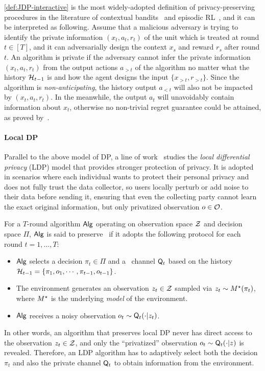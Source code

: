 \cref{def:JDP-interactive} is the most widely-adopted definition of privacy-preserving procedures in the literature of contextual bandits~\citep{shariff2018differentially, azize2024open} and episodic RL~\citep{vietri2020private}, and it can be interpreted as following.
Assume that a malicious adversary is trying to identify the private information $(x_t,a_t,r_t)$ of the unit which is treated at round $t\in[T]$, and it can adversarially design the context $x_{s}$ and reward $r_s$ after round $t$. An algorithm is private if the adversary cannot infer the private information  $(x_t,a_t,r_t)$ from the output actions $a_{>t}$ of the algorithm no matter what the history $\mathcal{H}_{t-1}$ is and how the agent designs the input 
$\{x_{>t},r_{>t}\}$. Since the algorithm is \emph{non-anticipating}, %
the history output $a_{<t}$ will also not be impacted by $(x_t,a_t,r_t)$. In the meanwhile, the output $a_t$ will unavoidably contain information about $x_t$, otherwise no non-trivial regret guarantee could be attained, as proved by~\citet{shariff2018differentially}.


\paragraph{Local DP}
Parallel to the above model of DP, a line of work~\citep{kasiviswanathan2011can,duchi2013local,duchi2016local} studies the \emph{local differential privacy} (LDP) model that provides stronger protection of privacy. It is adopted in scenarios where each individual wants to protect their personal privacy and does not fully trust the data collector, so users locally perturb or add noise to their data before sending it, ensuring that even the collecting party cannot learn the exact original information, but only privatized observation $o \in \mathcal{O}$. 




For a $T$-round algorithm $\mathsf{Alg}$ operating on observation space $\mathcal{Z}$ and decision space $\Pi$, $\mathsf{Alg}$ is said to preserve \aLDP~if it adopts the following protocol for each round $t=1,...,T$:
\begin{itemize}
  \setlength{\parskip}{2pt}
    \item $\mathsf{Alg}$ selects a decision $\pi_t\in \Pi$ and a \aDP~channel $\mathsf{Q}_t$ based on the history $\mathcal{H}_{t-1}=\{\pi_1,o_1 ,\cdots, \pi_{t-1}, o_{t-1}\}$.
    \item The environment generates an observation $z_t\in \mathcal{Z}$ sampled via $z_t\sim M^\star(\pi_t)$, where $M^\star$ is the underlying \emph{model} of the environment. %
    \item $\mathsf{Alg}$ receives a noisy observation $o_t\sim \mathsf{Q}_t(\cdot|z_t)$.
\end{itemize}
In other words, an algorithm that preserves local DP never has direct access to the observation $z_t\in\mathcal{Z}$, and only the ``privatized'' observation $o_t\sim \mathsf{Q}_t(\cdot|z)$ is revealed. Therefore, an LDP algorithm has to adaptively select both the decision $\pi_t$ and also the private channel $\mathsf{Q}_t$ to obtain information from the environment. 







